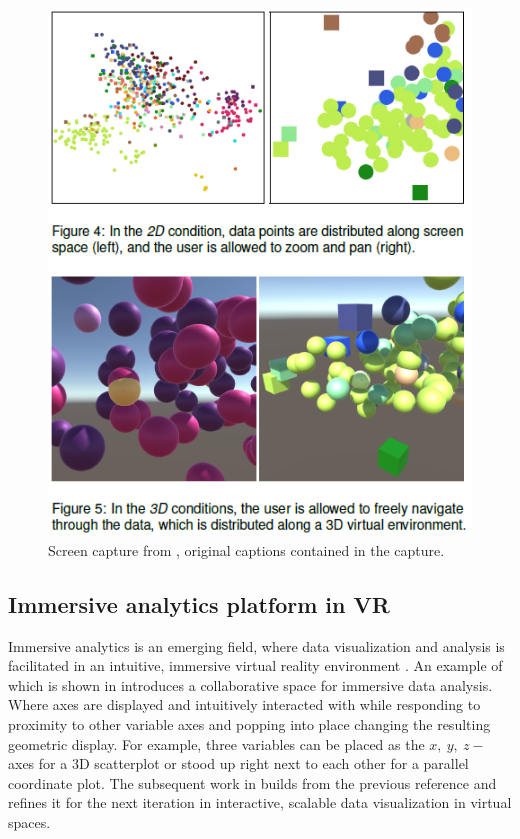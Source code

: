 \documentclass{monashthesis}
\begin{document}
\begin{figure}

{\centering \includegraphics[width=0.5\linewidth]{./figures/wagner18fig} 

}

\caption{Screen capture from \textcite{wagner_filho_immersive_2018}, original captions contained in the capture.}\label{fig:wagner18fig}
\end{figure}

\hypertarget{immersive-analytics-platform-in-vr}{%
\subsection{Immersive analytics platform in VR}\label{immersive-analytics-platform-in-vr}}

Immersive analytics is an emerging field, where data visualization and analysis is facilitated in an intuitive, immersive virtual reality environment \autocite{chandler_immersive_2015,cordeil_immersive_2017}. An example of which is shown in \textcite{cordeil_imaxes:_2017} introduces a collaborative space for immersive data analysis. Where axes are displayed and intuitively interacted with while responding to proximity to other variable axes and popping into place changing the resulting geometric display. For example, three variables can be placed as the \(x,~y,~z-\) axes for a 3D scatterplot or stood up right next to each other for a parallel coordinate plot. The subsequent work in \textcite{cordeil_iatk:_2019} builds from the previous reference and refines it for the next iteration in interactive, scalable data visualization in virtual spaces.
\end{document}

